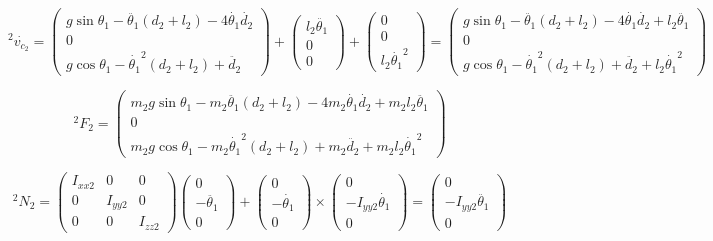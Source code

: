 \documentclass{homework}
\begin{document}
\begin{sol}
\[
  {^2}\dot{v_{c_2}} = 
  \begin{pmatrix}
    g \sin\theta_1 - \ddot{\theta_1} (d_2 + l_2) - 4 \dot{\theta_1} \dot{d_2} \\
    0 \\
    g \cos\theta_1 - \dot{\theta_1}^2 (d_2 + l_2) + \ddot{d_2}
  \end{pmatrix} +
  \begin{pmatrix}
    l_2 \ddot{\theta_1} \\
    0 \\
    0 
  \end{pmatrix} +
  \begin{pmatrix}
    0 \\
    0 \\
    l_2 \dot{\theta_1}^2
  \end{pmatrix} =
  \begin{pmatrix}
    g \sin\theta_1 - \ddot{\theta_1} (d_2 + l_2) - 4 \dot{\theta_1} \dot{d_2} + l_2 \ddot{\theta_1} \\
    0 \\
    g \cos\theta_1 - \dot{\theta_1}^2 (d_2 + l_2) + \ddot{d_2} + l_2 \dot{\theta_1}^2
  \end{pmatrix}
\]

\[
  {^2}F_2 = 
  \begin{pmatrix}
    m_2 g \sin\theta_1 - m_2 \ddot{\theta_1} (d_2 + l_2) - 4 m_2 \dot{\theta_1} \dot{d_2} + m_2 l_2 \ddot{\theta_1} \\
    0 \\
    m_2 g \cos\theta_1 - m_2 \dot{\theta_1}^2 (d_2 + l_2) + m_2 \ddot{d_2} + m_2 l_2 \dot{\theta_1}^2
  \end{pmatrix}
\]

\[
  {^2}N_2 = 
  \begin{pmatrix}
    I_{xx2} & 0 & 0 \\
    0 & I_{yy2} & 0 \\
    0 & 0 & I_{zz2}
  \end{pmatrix}
  \begin{pmatrix}
    0 \\
    -\ddot{\theta_1}  \\
    0
  \end{pmatrix} +
  \begin{pmatrix}
    0 \\
    -\dot{\theta_1}  \\
    0
  \end{pmatrix} \times
  \begin{pmatrix}
    0 \\
    -I_{yy2} \dot{\theta_1} \\
    0
  \end{pmatrix} =
  \begin{pmatrix}
    0 \\
    -I_{yy2} \ddot{\theta_1} \\
    0 
  \end{pmatrix}
\]


\end{sol}
\end{document}
